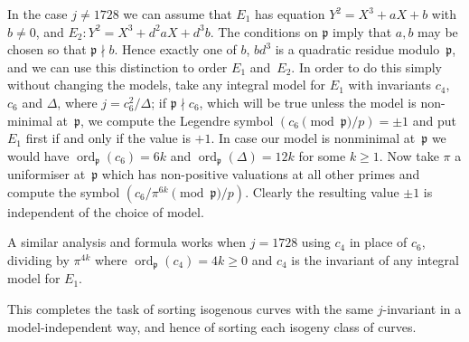 \documentclass{article}
\def\p{{\mathfrak p}}
\DeclareMathOperator{\ord}{ord}
\begin{document}
In the case $j\not=1728$ we can assume that $E_1$ has equation
$Y^2=X^3+aX+b$ with $b\not=0$, and $E_2: Y^2=X^3+d^2aX+d^3b$.  The
conditions on $\p$ imply that $a,b$ may be chosen so that $\p\nmid b$.
Hence exactly one of $b$, $bd^3$ is a quadratic residue modulo~$\p$,
and we can use this distinction to order $E_1$ and~$E_2$.  In order to
do this simply without changing the models, take any integral model
for $E_1$ with invariants $c_4$, $c_6$ and $\Delta$, where
$j=c_6^2/\Delta$; if $\p\nmid c_6$, which will be true unless the
model is non-minimal at~$\p$, we compute the Legendre symbol
$(c_6\pmod{\p}/p)=\pm1$ and put $E_1$ first if and only if the value
is $+1$.  In case our model is nonminimal at~$\p$ we would have
$\ord_{\p}(c_6)=6k$ and $\ord_{\p}(\Delta)=12k$ for some $k\ge1$.  Now
take $\pi$ a uniformiser at~$\p$ which has non-positive valuations at
all other primes and compute the symbol $(c_6/\pi^{6k}\pmod{\p}/p)$.
Clearly the resulting value $\pm1$ is independent of the choice of
model.

A similar analysis and formula works when $j=1728$ using $c_4$ in
place of $c_6$, dividing by $\pi^{4k}$ where $\ord_{\p}(c_4)=4k\ge0$
and $c_4$ is the invariant of any integral model for $E_1$.

This completes the task of sorting isogenous curves with the same
$j$-invariant in a model-independent way, and hence of sorting each
isogeny class of curves.
\end{document}

